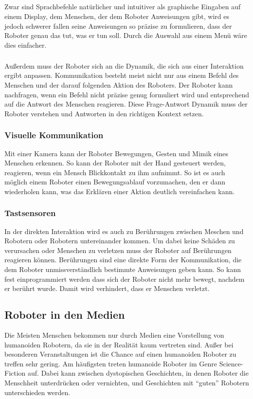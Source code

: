 \subparagraph{}
Zwar sind Sprachbefehle natürlicher und intuitiver als graphische Eingaben auf
einem Display, dem Menschen, der dem Roboter Anweisungen gibt, wird es jedoch
schwerer fallen seine Anweisungen so präzise zu formulieren, dass der Roboter
genau das tut, was er tun soll. Durch die Auswahl aus einem Menü wäre dies
einfacher.

\subparagraph{}
Außerdem muss der Roboter sich an die Dynamik, die sich aus einer Interaktion
ergibt anpassen. Kommunikation besteht meist nicht nur aus einem Befehl des
Menschen und der darauf folgenden Aktion des Roboters. Der Roboter kann
nachfragen, wenn ein Befehl nicht präzise genug formuliert wird und entsprechend
auf die Antwort des Menschen reagieren. Diese Frage-Antwort Dynamik muss der
Roboter verstehen und Antworten in den richtigen Kontext setzen.

\subsubsection{Visuelle Kommunikation}
Mit einer Kamera kann der Roboter Bewegungen, Gesten und Mimik eines Menschen
erkennen. So kann der Roboter mit der Hand gesteuert werden, reagieren, wenn ein
Mensch Blickkontakt zu ihm aufnimmt. So ist es auch möglich einem Roboter einen
Bewegungsablauf vorzumachen, den er dann wiederholen kann, was das Erklären
einer Aktion deutlich vereinfachen kann.

\subsubsection{Tastsensoren}
In der direkten Interaktion wird es auch zu
Berührungen zwischen Meschen und Robotern oder Robotern untereinander kommen. Um
dabei keine Schäden zu verursachen oder Menschen zu verletzen muss der Roboter
auf Berührungen reagieren können. Berührungen sind eine direkte Form der
Kommunikation, die dem Roboter unmissverständlich bestimmte Anweisungen geben
kann. So kann fest einprogrammiert werden dass sich der Roboter nicht mehr
bewegt, nachdem er berührt wurde. Damit wird verhindert, dass er Menschen
verletzt. \cite{Prassler2004}

\subsection{Roboter in den Medien}\label{sec:roboter-in-medien}
Die Meisten Menschen bekommen nur durch Medien eine Vorstellung von humanoiden
Robotern, da sie in der Realität kaum vertreten sind. Außer bei besonderen
Veranstaltungen ist die Chance auf einen humanoiden Roboter zu treffen sehr
gering. Am häufigsten treten humanoide Roboter im Genre Science-Fiction auf.
Dabei kann zwischen dystopischen Geschichten, in denen Roboter die Menschheit
unterdrücken oder vernichten, und Geschichten mit "`guten"' Robotern
unterschieden werden.


